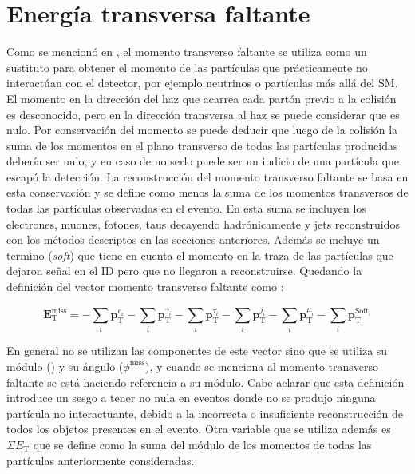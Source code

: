 

\section{Energía transversa faltante}


Como se mencionó en 
, el momento transverso faltante se utiliza como un sustituto para obtener el momento de las partículas que prácticamente no interactúan con el detector, por ejemplo neutrinos o partículas más allá del SM. El momento en la dirección del haz que acarrea cada partón previo a la colisión es desconocido, pero en la dirección transversa al haz se puede considerar que es nulo. Por conservación del momento se puede deducir que luego de la colisión la suma de los momentos en el plano transverso de todas las partículas producidas debería ser nulo, y en caso de no serlo puede ser un indicio de una partícula que escapó la detección. La reconstrucción del momento transverso faltante se basa en esta conservación y se define como menos la suma de los momentos transversos de todas las partículas observadas en el evento. En esta suma se incluyen los electrones, muones, fotones, taus decayendo hadrónicamente y jets reconstruidos con los métodos descriptos en las secciones anteriores. Además se incluye un termino (\textit{soft}) que tiene en cuenta el momento en la traza de las partículas que dejaron señal en el ID pero que no llegaron a reconstruirse. Quedando la definición del vector momento transverso faltante como \cite{PERF-2016-07}:

\begin{equation}
\textbf{E}_{\text{T}}^{\text{miss}} = -\sum_{i}\textbf{p}_{\text{T}}^{e_i}-\sum_{i}\textbf{p}_{\text{T}}^{\gamma_i}-\sum_{i}\textbf{p}_{\text{T}}^{\tau_i}-\sum_{i}\textbf{p}_{\text{T}}^{j_i}-\sum_{i}\textbf{p}_{\text{T}}^{\mu_i}-\sum_{i}\textbf{p}_{\text{T}}^{\text{Soft}_i}
\end{equation}


En general no se utilizan las componentes de este vector sino que se utiliza su módulo (\met) y su ángulo ($\phi^{\text{miss}}$), y cuando se menciona al momento transverso faltante se está haciendo referencia a su módulo. Cabe aclarar que esta definición introduce un sesgo a tener \met no nula en eventos donde no se produjo ninguna partícula no interactuante, debido a la incorrecta o insuficiente reconstrucción de todos los objetos presentes en el evento. Otra variable que se utiliza además es $\Sigma E_{\text{T}}$ que se define como la suma del módulo de los momentos de todas las partículas anteriormente consideradas. 

